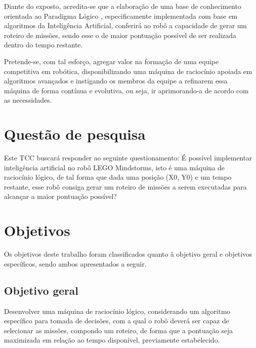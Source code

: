 Diante do exposto, acredita-se que a elaboração de uma base de conhecimento orientada ao Paradigma Lógico \cite{tucker2009linguagens}, especificamente implementada com base em algoritmos da Inteligência Artificial, conferirá ao robô a capacidade de gerar um roteiro de missões, sendo esse o de maior pontuação possível de ser realizada dentro do tempo restante.

Pretende-se, com tal esforço, agregar valor na formação de uma equipe competitiva em robótica, disponibilizando uma máquina de raciocínio apoiada em algoritmos avançados e instigando os membros da equipe a refinarem essa máquina de forma contínua e evolutiva, ou seja, ir aprimorando-a de acordo com as necessidades.

\section{Questão de pesquisa}

Este TCC buscará responder ao seguinte questionamento: É possível implementar inteligência artificial no robô LEGO Mindstorms, isto é uma máquina de raciocínio lógico, de tal forma que dada uma posição (X0, Y0) e um tempo restante, esse robô consiga gerar um roteiro de missões a serem executadas para alcançar a maior pontuação possível?

\section{Objetivos}
Os objetivos deste trabalho foram classificados quanto à objetivo geral e objetivos específicos, sendo ambos apresentados a seguir.

\subsection{Objetivo geral}
Desenvolver uma máquina de raciocínio lógico, considerando um algoritmo específico para tomada de decisões, com a qual o robô deverá ser capaz de selecionar as missões, compondo um roteiro, de forma que a pontuação seja maximizada em relação ao tempo disponível, previamente estabelecido.

